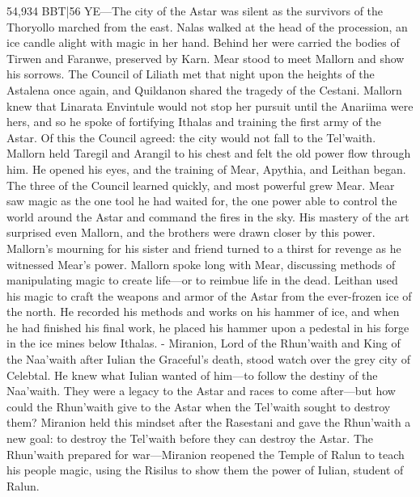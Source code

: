 \documentclass[smalldemyvopaper,11pt,twoside,onecolumn,openright,extrafontsizes]{memoir}
\begin{document}
54,934 BBT|56 YE—The city of the Astar was silent as the survivors of the Thoryollo marched from the east. Nalas walked at the head of the procession, an ice candle alight with magic in her hand. Behind her were carried the bodies of Tirwen and Faranwe, preserved by Karn. Mear stood to meet Mallorn and show his sorrows. The Council of Liliath met that night upon the heights of the Astalena once again, and Quildanon shared the tragedy of the Cestani. Mallorn knew that Linarata Envintule would not stop her pursuit until the Anariima were hers, and so he spoke of fortifying Ithalas and training the first army of the Astar. Of this the Council agreed: the city would not fall to the Tel’waith. Mallorn held Taregil and Arangil to his chest and felt the old power flow through him. He opened his eyes, and the training of Mear, Apythia, and Leithan began. The three of the Council learned quickly, and most powerful grew Mear. Mear saw magic as the one tool he had waited for, the one power able to control the world around the Astar and command the fires in the sky. His mastery of the art surprised even Mallorn, and the brothers were drawn closer by this power. Mallorn’s mourning for his sister and friend turned to a thirst for revenge as he witnessed Mear’s power. Mallorn spoke long with Mear, discussing methods of manipulating magic to create life—or to reimbue life in the dead. Leithan used his magic to craft the weapons and armor of the Astar from the ever-frozen ice of the north. He recorded his methods and works on his hammer of ice, and when he had finished his final work, he placed his hammer upon a pedestal in his forge in the ice mines below Ithalas.
- Miranion, Lord of the Rhun’waith and King of the Naa’waith after Iulian the Graceful’s death, stood watch over the grey city of Celebtal. He knew what Iulian wanted of him—to follow the destiny of the Naa’waith. They were a legacy to the Astar and races to come after—but how could the Rhun’waith give to the Astar when the Tel’waith sought to destroy them? Miranion held this mindset after the Rasestani and gave the Rhun’waith a new goal: to destroy the Tel’waith before they can destroy the Astar. The Rhun’waith prepared for war—Miranion reopened the Temple of Ralun to teach his people magic, using the Risilus to show them the power of Iulian, student of Ralun.
\end{document}

